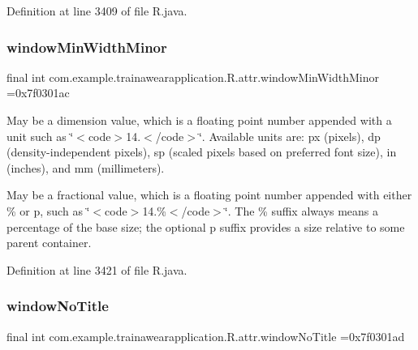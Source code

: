 Definition at line 3409 of file R.\+java.

\mbox{\label{classcom_1_1example_1_1trainawearapplication_1_1_r_1_1attr_ae5a639562b2329aeae3f0f0cb8093450}} 
\subsubsection{\texorpdfstring{windowMinWidthMinor}{windowMinWidthMinor}}
{\footnotesize\ttfamily final int com.\+example.\+trainawearapplication.\+R.\+attr.\+window\+Min\+Width\+Minor =0x7f0301ac\hspace{0.3cm}{\ttfamily [static]}}

May be a dimension value, which is a floating point number appended with a unit such as \char`\"{}$<$code$>$14.\+5sp$<$/code$>$\char`\"{}. Available units are\+: px (pixels), dp (density-\/independent pixels), sp (scaled pixels based on preferred font size), in (inches), and mm (millimeters). 

May be a fractional value, which is a floating point number appended with either \% or p, such as \char`\"{}$<$code$>$14.\%$<$/code$>$\char`\"{}. The \% suffix always means a percentage of the base size; the optional p suffix provides a size relative to some parent container. 

Definition at line 3421 of file R.\+java.

\mbox{\label{classcom_1_1example_1_1trainawearapplication_1_1_r_1_1attr_a2b566635d5ee696b197c292fd1245839}} 
\subsubsection{\texorpdfstring{windowNoTitle}{windowNoTitle}}
{\footnotesize\ttfamily final int com.\+example.\+trainawearapplication.\+R.\+attr.\+window\+No\+Title =0x7f0301ad\hspace{0.3cm}{\ttfamily [static]}}

